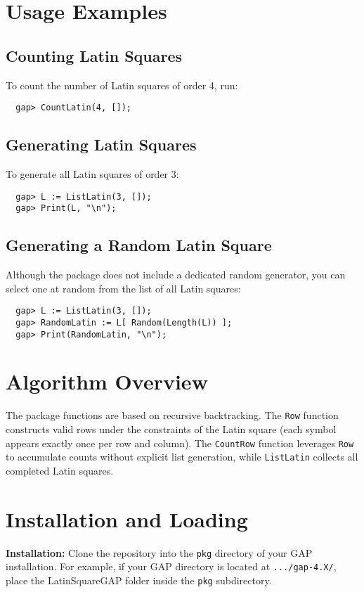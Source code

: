 \documentclass{report}
\begin{document}
\chapter{Usage Examples}
\section{Counting Latin Squares}
To count the number of Latin squares of order 4, run:
\begin{verbatim}
  gap> CountLatin(4, []);
\end{verbatim}

\section{Generating Latin Squares}
To generate all Latin squares of order 3:
\begin{verbatim}
  gap> L := ListLatin(3, []);
  gap> Print(L, "\n");
\end{verbatim}

\section{Generating a Random Latin Square}
Although the package does not include a dedicated random generator, you can select one at random from the list of all Latin squares:
\begin{verbatim}
  gap> L := ListLatin(3, []);
  gap> RandomLatin := L[ Random(Length(L)) ];
  gap> Print(RandomLatin, "\n");
\end{verbatim}

\chapter{Algorithm Overview}
The package functions are based on recursive backtracking. The \texttt{Row} function constructs valid rows under the constraints of the Latin square (each symbol appears exactly once per row and column). The \texttt{CountRow} function leverages \texttt{Row} to accumulate counts without explicit list generation, while \texttt{ListLatin} collects all completed Latin squares.

\chapter{Installation and Loading}
\textbf{Installation:}  
Clone the repository into the \texttt{pkg} directory of your GAP installation. For example, if your GAP directory is located at \texttt{.../gap-4.X/}, place the LatinSquareGAP folder inside the \texttt{pkg} subdirectory.
\end{document}
